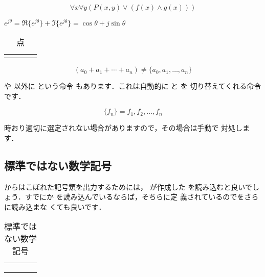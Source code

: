 %
\begin{InOut}
\[ \forall{x}\forall{y}( 
     P(x,y)\vee(f(x)\wedge g(x))) \] 
\end{InOut}
%
\begin{InOut}
\( e^{j\theta}=\Re{\{e^{j\theta}\}}
   +\Im{\{e^{j\theta}\}}
   =\cos\theta+j\sin\theta\)
\end{InOut}
\begin{table}[htbp]
\begin{scenter}
\caption{点}
%
%
%
%
%
%
\begin{tabular}{LCCC}
 &   &  &  \\
\end{tabular}
\end{scenter}
\end{table}
\begin{InOut}
\[ (a_0+a_1+\cdots+a_n) 
   \neq \{a_0,a_1,\ldots,a_n\} \]
\end{InOut}

\begin{Exe}
 や  以外に  という命令
もあります．これは自動的に  と  を
切り替えてくれる命令です．
\begin{InOut}
\[ \{f_n\} = f_1, f_2, \dots, f_n \]
\end{InOut} 
時おり適切に選定されない場合がありますので，その場合は手動で
対処します．
%  
\end{Exe}


\subsection{標準ではない数学記号\zdash{}}
{\LaTeXe}からはこぼれた記号類を出力するためには，
が作成した
を読み込むと良いでしょう．すでにか
を読み込んでいるならば，そちらに定
義されているのでをさらに読み込まな
くても良いです．
\begin{table}[htbp]
 \begin{scenter}
\caption{標準ではない数学記号}
  \begin{tabular}{LCCC}
  &  &  &  \\
  &  &  &  \\
  &   &  & & \\
  \end{tabular}
 \end{scenter}
\end{table}


